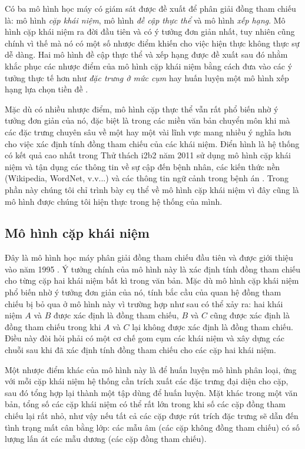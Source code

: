 Có ba mô hình học máy có giám sát được đề xuất để phân giải đồng tham chiếu là: mô hình \emph{cặp khái niệm}, mô hình \emph{đề cập thực thể} và mô hình \emph{xếp hạng}. Mô hình cặp khái niệm ra đời đầu tiên và có ý tưởng đơn giản nhất, tuy nhiên cũng chính vì thế mà nó có một số nhược điểm khiến cho việc hiện thực không thực sự dễ dàng. Hai mô hình đề cập thực thể và xếp hạng được đề xuất sau đó nhằm khắc phục các nhược điểm của mô hình cặp khái niệm bằng cách đưa vào các ý tưởng thực tế hơn như \emph{đặc trưng ở mức cụm} \cite{Yang2004} hay huấn luyện một mô hình xếp hạng lựa chọn tiền đề \cite{Yang2003}.

Mặc dù có nhiều nhược điểm, mô hình cặp thực thể vẫn rất phổ biến nhờ ý tưởng đơn giản của nó, đặc biệt là trong các miền văn bản chuyển môn khi mà các đặc trưng chuyên sâu về một hay một vài lĩnh vực mang nhiều ý nghĩa hơn cho việc xác định tính đồng tham chiếu của các khái niệm. Điển hình là hệ thống có kết quả cao nhất trong Thử thách i2b2 năm 2011 sử dụng mô hình cặp khái niệm và tận dụng các thông tin về sự cập đến bệnh nhân, các kiến thức nền (Wikipedia, WordNet, v.v...) và các thông tin ngữ cảnh trong bệnh án \cite{YanXu2012}. Trong phần này chúng tôi chỉ trình bày cụ thể về mô hình cặp khái niệm vì đây cũng là mô hình được chúng tôi hiện thực trong hệ thống của mình.

\subsection*{Mô hình cặp khái niệm}
Đây là mô hình học máy phân giải đồng tham chiếu đầu tiên và được giới thiệu vào năm 1995 \cite{Aone&Bennett1995}. Ý tưởng chính của mô hình này là xác định tính đồng tham chiếu cho từng cặp hai khái niệm bất kì trong văn bản. Mặc dù mô hình cặp khái niệm phổ biến nhờ ý tưởng đơn giản của nó, tính bắc cầu của quan hệ đồng tham chiếu bị bỏ qua ở mô hình này vì trường hợp như sau có thể xảy ra: hai khái niệm $A$ và $B$ được xác định là đồng tham chiếu, $B$ và $C$ cũng được xác định là đồng tham chiếu trong khi $A$ và $C$ lại không được xác định là đồng tham chiếu. Điều này đòi hỏi phải có một cơ chế gom cụm các khái niệm và xây dựng các chuỗi sau khi đã xác định tính đồng tham chiếu cho các cặp hai khái niệm.

Một nhược điểm khác của mô hình này là để huấn luyện mô hình phân loại, ứng với mỗi cặp khái niệm hệ thống cần trích xuất các đặc trưng đại diện cho cặp, sau đó tổng hợp lại thành một tập dùng để huấn luyện. Mặt khác trong một văn bản, tổng số các cặp khái niệm có thể rất lớn trong khi số các cặp đồng tham chiếu lại rất nhỏ, như vậy nếu tất cả các cặp được rút trích đặc trưng sẽ dẫn đến tình trạng mất cân bằng lớp: các mẫu âm (các cặp không đồng tham chiếu) có số lượng lấn át các mẫu dương (các cặp đồng tham chiếu).

